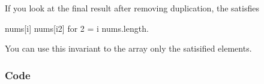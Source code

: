 \documentclass[letterpaper,12pt,english]{book}
\begin{document}
\sphinxAtStartPar
If you look at the final result after removing duplication, the   satisfies

\begin{sphinxVerbatim}[commandchars=\\\{\}]
nums[i] \PYGZgt{} nums[i\PYGZhy{}2] for 2 \PYGZlt{}= i \PYGZlt{} nums.length.
\end{sphinxVerbatim}

\sphinxAtStartPar
You can use this invariant to  the array  only the satisified elements.


\subsubsection{Code}
\label{\detokenize{Sorting/04_SORT_80_Remove_Duplicates_from_Sorted_Array:id1}}
\end{document}

